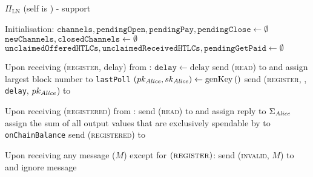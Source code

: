 \begin{protocolbox}{$\Pi_{\mathrm{LN}}$ (self is \alice) - support}
  \label{alg:protocol:support}
  \begin{algorithmic}[1]
    \State Initialisation:
    \Indent
      \State $\mathtt{channels}, \mathtt{pendingOpen}, \mathtt{pendingPay},
      \mathtt{pendingClose} \gets \emptyset$
      \State $\mathtt{newChannels}, \mathtt{closedChannels} \gets \emptyset$
      \State $\mathtt{unclaimedOfferedHTLCs}, \mathtt{unclaimedReceivedHTLCs},
      \mathtt{pendingGetPaid} \gets \emptyset$
    \EndIndent
    \State

    \State Upon receiving (\textsc{register}, delay) from \environment:
    \Indent
      \State $\mathtt{delay} \gets \mathrm{delay}$
      \State send (\textsc{read}) to \ledger{} and assign largest block number
      to \texttt{lastPoll}
      \State $\left(pk_{\mathit{Alice}}, sk_{\mathit{Alice}}\right) \gets
      \mathrm{genKey}\left(\right)$
      \State send (\textsc{register}, \alice, \texttt{delay},
      $pk_{\mathit{Alice}}$) to \adversary {}
    \EndIndent
    \State

    \State Upon receiving (\textsc{registered}) from \adversary:
    \Indent
      \State send (\textsc{read}) to \ledger{} and assign reply to
      $\Sigma_{\mathit{Alice}}$
      \State assign the sum of all output values that are exclusively spendable
      by \alice{} to \texttt{onChainBalance}
      \State send (\textsc{registered}) to \environment
    \EndIndent
    \State

    \State Upon receiving any message ($M$) except for
    $\left(\textsc{register}\right)$:
    \Indent
        \State send (\textsc{invalid}, $M$) to \adversary{} and ignore message
      \EndIf
    \EndIndent
    \State


\end{algorithmic}
\end{protocolbox}
